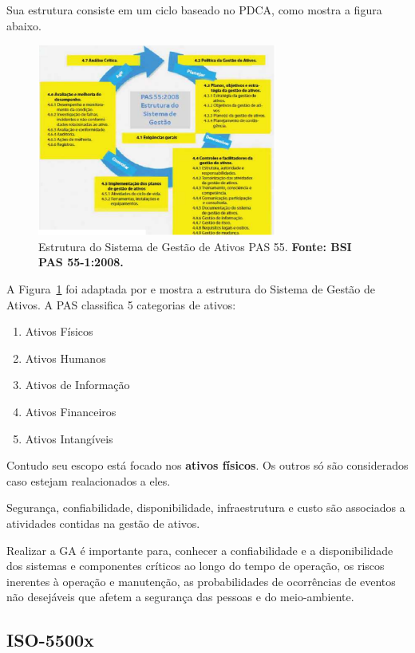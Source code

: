 Sua estrutura consiste em um ciclo baseado no PDCA, como mostra a figura abaixo.

\graphicspath{{figuras/}}
\begin{figure}[H]
\centering
\includegraphics[width=0.7\textwidth]{figura1.eps}
\caption{Estrutura do Sistema de Gestão de Ativos PAS 55. \textbf{Fonte: BSI PAS 55-1:2008.}}
\label{estrutura_pas_55}
\end{figure}

A Figura~\ref{estrutura_pas_55} foi adaptada por \cite{valeria2013} e mostra a estrutura do Sistema de Gestão de Ativos. A PAS classifica 5 categorias de ativos:

\begin{enumerate}
	\item{Ativos Físicos}
	\item{Ativos Humanos}
	\item{Ativos de Informação}
	\item{Ativos Financeiros}
	\item{Ativos Intangíveis}
\end{enumerate}

Contudo seu escopo está focado nos \textbf{ativos físicos}. Os outros só são considerados caso estejam realacionados a eles.

Segurança, confiabilidade, disponibilidade, infraestrutura e custo são associados a atividades contidas na gestão de ativos. 

Realizar a GA é importante para, conhecer a confiabilidade e a disponibilidade dos sistemas e componentes críticos ao longo do tempo de operação, os riscos inerentes à operação e manutenção, as probabilidades de ocorrências de eventos não desejáveis que afetem a segurança das pessoas e do meio-ambiente.


\subsection{ISO-5500x}

